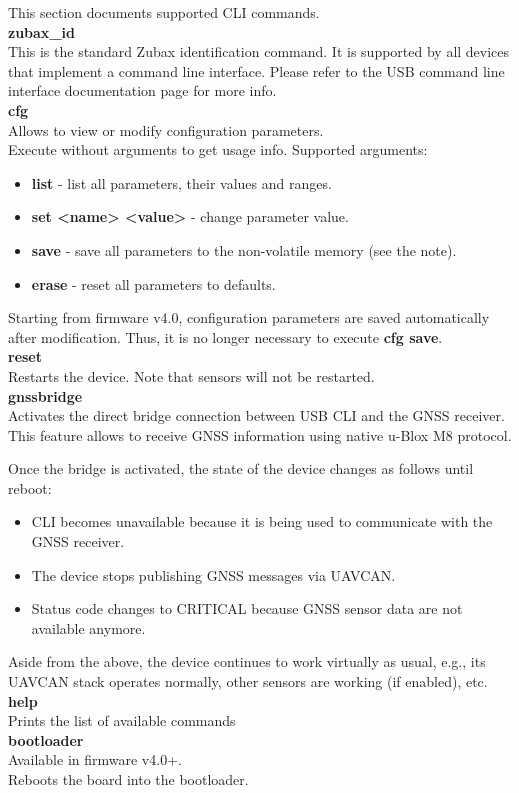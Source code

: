 \documentclass{zubaxdoc}
\begin{document}
This section documents supported CLI commands.\\
\textbf{zubax{\_}id}\\
This is the standard Zubax identification command. It is supported by all devices that implement a command line interface. Please refer to the USB command line interface documentation page for more info.\\
\textbf{cfg}\\
Allows to view or modify configuration parameters.\\
Execute without arguments to get usage info. Supported arguments:
\begin{itemize}
\item \textbf{list} - list all parameters, their values and ranges.
\item \textbf{set <name> <value>} - change parameter value.
\item \textbf{save} - save all parameters to the non-volatile memory (see the note).
\item \textbf{erase} - reset all parameters to defaults.
\end{itemize}

Starting from firmware v4.0, configuration parameters are saved automatically after modification. Thus, it is no longer necessary to execute \textbf{cfg save}.\\
\textbf{reset}\\
Restarts the device. Note that sensors will not be restarted.\\
\textbf{gnssbridge}\\
Activates the direct bridge connection between USB CLI and the GNSS receiver. This feature allows to receive GNSS information using native u-Blox M8 protocol.

Once the bridge is activated, the state of the device changes as follows until reboot:
\begin{itemize}
\item CLI becomes unavailable because it is being used to communicate with the GNSS receiver.
\item The device stops publishing GNSS messages via UAVCAN.
\item Status code changes to CRITICAL because GNSS sensor data are not available anymore.
\end{itemize}

Aside from the above, the device continues to work virtually as usual, e.g., its UAVCAN stack operates normally, other sensors are working (if enabled), etc.\\
\textbf{help}\\
Prints the list of available commands\\
\textbf{bootloader}\\
Available in firmware v4.0+.\\
Reboots the board into the bootloader.\\
\end{document}
